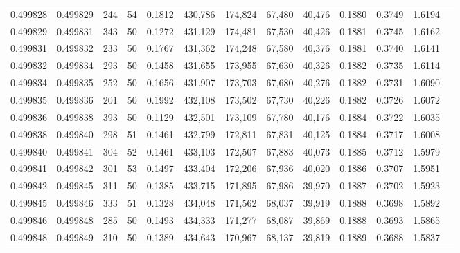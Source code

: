 \begin{tabular}{rrrrrrrrrrrrr}
0.499828 & 0.499829 & 244 &  54 &                                     0.1812 & 430,786 & 174,824 &  67,480 &  40,476 & 0.1880 & 0.3749 & 1.6194 \\
0.499829 & 0.499831 & 343 &  50 &                                     0.1272 & 431,129 & 174,481 &  67,530 &  40,426 & 0.1881 & 0.3745 & 1.6162 \\
0.499831 & 0.499832 & 233 &  50 &                                     0.1767 & 431,362 & 174,248 &  67,580 &  40,376 & 0.1881 & 0.3740 & 1.6141 \\
0.499832 & 0.499834 & 293 &  50 &                                     0.1458 & 431,655 & 173,955 &  67,630 &  40,326 & 0.1882 & 0.3735 & 1.6114 \\
0.499834 & 0.499835 & 252 &  50 &                                     0.1656 & 431,907 & 173,703 &  67,680 &  40,276 & 0.1882 & 0.3731 & 1.6090 \\
0.499835 & 0.499836 & 201 &  50 &                                     0.1992 & 432,108 & 173,502 &  67,730 &  40,226 & 0.1882 & 0.3726 & 1.6072 \\
0.499836 & 0.499838 & 393 &  50 &                                     0.1129 & 432,501 & 173,109 &  67,780 &  40,176 & 0.1884 & 0.3722 & 1.6035 \\
0.499838 & 0.499840 & 298 &  51 &                                     0.1461 & 432,799 & 172,811 &  67,831 &  40,125 & 0.1884 & 0.3717 & 1.6008 \\
0.499840 & 0.499841 & 304 &  52 &                                     0.1461 & 433,103 & 172,507 &  67,883 &  40,073 & 0.1885 & 0.3712 & 1.5979 \\
0.499841 & 0.499842 & 301 &  53 &                                     0.1497 & 433,404 & 172,206 &  67,936 &  40,020 & 0.1886 & 0.3707 & 1.5951 \\
0.499842 & 0.499845 & 311 &  50 &                                     0.1385 & 433,715 & 171,895 &  67,986 &  39,970 & 0.1887 & 0.3702 & 1.5923 \\
0.499845 & 0.499846 & 333 &  51 &                                     0.1328 & 434,048 & 171,562 &  68,037 &  39,919 & 0.1888 & 0.3698 & 1.5892 \\
0.499846 & 0.499848 & 285 &  50 &                                     0.1493 & 434,333 & 171,277 &  68,087 &  39,869 & 0.1888 & 0.3693 & 1.5865 \\
0.499848 & 0.499849 & 310 &  50 &                                     0.1389 & 434,643 & 170,967 &  68,137 &  39,819 & 0.1889 & 0.3688 & 1.5837 \\

\end{tabular}
